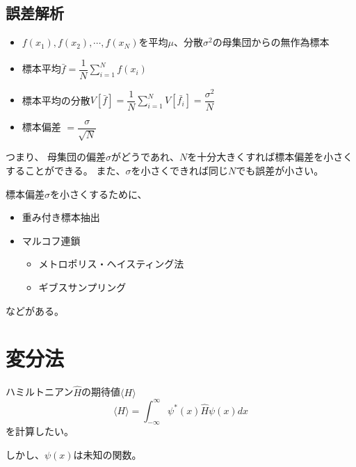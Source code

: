 \documentclass[dvipdfmx]{beamer}
\begin{document}
    \subsection{誤差解析}
    \begin{frame}{\insertsubsection}

        \begin{itemize}
            \item $f(x_1),f(x_2),\cdots,f(x_N)$を平均$\mu$、分散$\sigma^2$の母集団からの無作為標本
            \item 標本平均$\bar{f} = \dfrac{1}{N} \sum_{i=1}^{N}f(x_i)$
            \item 標本平均の分散$V[\bar{f}] = \dfrac{1}{N}\sum_{i=1}^{N} V[\bar{f_i}] = \dfrac{\sigma^2}{N}$
            \item 標本偏差 $ = \dfrac{\sigma}{\sqrt{N}}$
        \end{itemize}

        つまり、
        \alert{母集団の偏差$\sigma$がどうであれ、$N$を十分大きくすれば標本偏差を小さくすることができる。}
        また、\alert{$\sigma$を小さくできれば同じ$N$でも誤差が小さい。}

    \end{frame}

    \begin{frame}
        標本偏差$\sigma$を小さくするために、
        \begin{itemize}
            \item 重み付き標本抽出
            \item マルコフ連鎖
                \begin{itemize}
                    \item メトロポリス・ヘイスティング法
                    \item ギブスサンプリング
                \end{itemize}
        \end{itemize}
        などがある。
    \end{frame}

    \section{変分法}
    \begin{frame}
        ハミルトニアン$\hat{H}$の期待値$\langle H \rangle$
        \begin{equation}
            \langle H \rangle = \int_{-\infty}^\infty \psi^*(x) \hat{H} \psi(x) dx
        \end{equation}
        を計算したい。

        しかし、$\psi(x)$は未知の関数。
    \end{frame}
\end{document}
